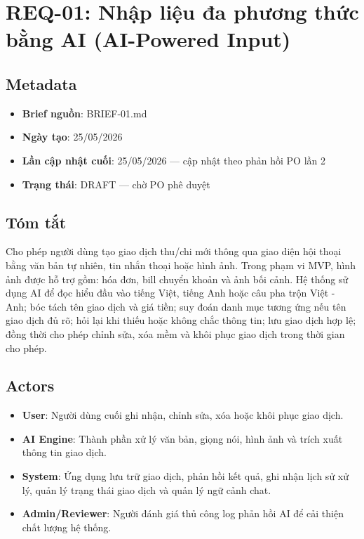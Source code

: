 \section{REQ-01: Nhập liệu đa phương thức bằng AI (AI-Powered Input)}



\subsection{Metadata}

\begin{itemize}
\item \textbf{Brief nguồn}: BRIEF-01.md
\item \textbf{Ngày tạo}: 25/05/2026
\item \textbf{Lần cập nhật cuối}: 25/05/2026 — cập nhật theo phản hồi PO lần 2
\item \textbf{Trạng thái}: DRAFT — chờ PO phê duyệt
\end{itemize}
\subsection{Tóm tắt}

Cho phép người dùng tạo giao dịch thu/chi mới thông qua giao diện hội thoại bằng văn bản tự nhiên, tin nhắn thoại hoặc hình ảnh. Trong phạm vi MVP, hình ảnh được hỗ trợ gồm: hóa đơn, bill chuyển khoản và ảnh bối cảnh. Hệ thống sử dụng AI để đọc hiểu đầu vào tiếng Việt, tiếng Anh hoặc câu pha trộn Việt - Anh; bóc tách tên giao dịch và giá tiền; suy đoán danh mục tương ứng nếu tên giao dịch đủ rõ; hỏi lại khi thiếu hoặc không chắc thông tin; lưu giao dịch hợp lệ; đồng thời cho phép chỉnh sửa, xóa mềm và khôi phục giao dịch trong thời gian cho phép.



\subsection{Actors}

\begin{itemize}
\item \textbf{User}: Người dùng cuối ghi nhận, chỉnh sửa, xóa hoặc khôi phục giao dịch.
\item \textbf{AI Engine}: Thành phần xử lý văn bản, giọng nói, hình ảnh và trích xuất thông tin giao dịch.
\item \textbf{System}: Ứng dụng lưu trữ giao dịch, phản hồi kết quả, ghi nhận lịch sử xử lý, quản lý trạng thái giao dịch và quản lý ngữ cảnh chat.
\item \textbf{Admin/Reviewer}: Người đánh giá thủ công log phản hồi AI để cải thiện chất lượng hệ thống.
\end{itemize}
